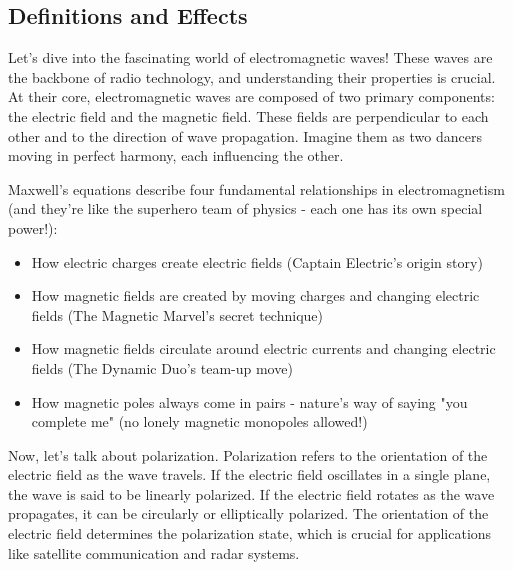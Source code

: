 \subsection{Definitions and Effects}
\label{subsec:ac-basics2}

Let's dive into the fascinating world of electromagnetic waves! These waves are the backbone of radio technology, and understanding their properties is crucial. At their core, electromagnetic waves are composed of two primary components: the electric field and the magnetic field. These fields are perpendicular to each other and to the direction of wave propagation. Imagine them as two dancers moving in perfect harmony, each influencing the other. 

Maxwell's equations describe four fundamental relationships in electromagnetism (and they're like the superhero team of physics - each one has its own special power!):
\begin{itemize}[noitemsep]    \item How electric charges create electric fields (Captain Electric's origin story)
    \item How magnetic fields are created by moving charges and changing electric fields (The Magnetic Marvel's secret technique)
    \item How magnetic fields circulate around electric currents and changing electric fields (The Dynamic Duo's team-up move)
    \item How magnetic poles always come in pairs - nature's way of saying "you complete me" (no lonely magnetic monopoles allowed!)
\end{itemize}

Now, let's talk about polarization. Polarization refers to the orientation of the electric field as the wave travels. If the electric field oscillates in a single plane, the wave is said to be linearly polarized. If the electric field rotates as the wave propagates, it can be circularly or elliptically polarized. The orientation of the electric field determines the polarization state, which is crucial for applications like satellite communication and radar systems.

